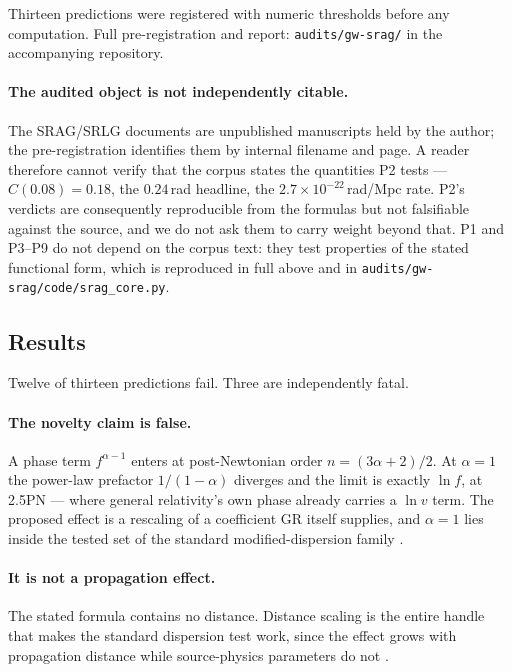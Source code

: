 \documentclass[11pt,a4paper]{article}
\begin{document}
Thirteen predictions were registered with numeric thresholds before any
computation. Full pre-registration and report:
\texttt{audits/gw-srag/} in the accompanying repository.

\paragraph{The audited object is not independently citable.} The SRAG/SRLG
documents are unpublished manuscripts held by the author; the pre-registration
identifies them by internal filename and page. A reader therefore cannot verify
that the corpus states the quantities P2 tests --- $C(0.08) = 0.18$, the
$0.24$\,rad headline, the $2.7\times10^{-22}$\,rad/Mpc rate. P2's verdicts are
consequently reproducible from the formulas but not falsifiable against the
source, and we do not ask them to carry weight beyond that. P1 and P3--P9 do
not depend on the corpus text: they test properties of the stated functional
form, which is reproduced in full above and in
\texttt{audits/gw-srag/code/srag\_core.py}.

\subsection{Results}

Twelve of thirteen predictions fail. Three are independently fatal.

\paragraph{The novelty claim is false.} A phase term $f^{\alpha-1}$ enters at
post-Newtonian order $n = (3\alpha+2)/2$. At $\alpha = 1$ the power-law
prefactor $1/(1-\alpha)$ diverges and the limit is exactly $\ln f$, at 2.5PN
--- where general relativity's own phase already carries a $\ln v$ term. The
proposed effect is a rescaling of a coefficient GR itself supplies, and
$\alpha = 1$ lies inside the tested set of the standard modified-dispersion
family \cite{mirshekari2012constraining, ligo2021tgr}.

\paragraph{It is not a propagation effect.} The stated formula contains no
distance. Distance scaling is the entire handle that makes the standard
dispersion test work, since the effect grows with propagation distance while
source-physics parameters do not \cite{mirshekari2012constraining}.
\end{document}
